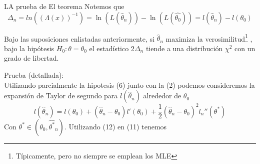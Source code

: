 \documentclass{beamer}
\begin{document}
\begin{frame}{LA prueba de El teorema}
Notemos que 
\begin{equation}
\Delta_n  =  ln \left( (\Lambda(x) )^{-1} \right) = \ln ( L(\hat{\theta}_n) )- \ln \left( L(\hat{\theta_0}) \right) = l(\hat{\theta}_n) -l({\theta}_0)
\end{equation}
\begin{theorem}
Bajo las suposiciones enlistadas anteriormente, si $\hat{\theta}_n$ maximiza la verosimilitud\footnote{ Típicamente, pero no siempre se emplean los MLE} , bajo la hipótesis $H_0: \theta = \theta_0$ el estadístico 2$\Delta_n$ tiende a una distribución $\chi^2$ con un grado de libertad.
\end{theorem}
Prueba (detallada): \\
Utilizando parcialmente la hipotesis (6) junto con la (2) podemos consideremos la expansión de Taylor de segundo para $l(\hat{\theta}_n)$ alrededor de $\theta_0$   
\begin{equation}
l(\hat{\theta}_n) = l(\theta_0) +(\hat{\theta}_n - \theta_0)l'(\theta_0) + \frac{1}{2}(\hat{\theta}_n - \theta_0)^2l_n''(\theta^*)
\end{equation}
Con $\theta^* \in (\theta_0, \hat{\theta^*}_n)$. Utilizando (12) en (11) tenemos 
\end{frame}
\end{document}
